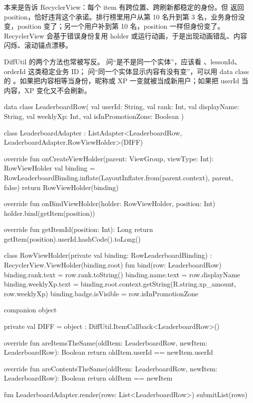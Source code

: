  本来是告诉 RecyclerView：每个 item 有跨位置、跨刷新都稳定的身份。但  返回 position，恰好违背这个承诺。排行榜里用户从第 10 名升到第 3 名，业务身份没变，position 变了；另一个用户补到第 10 名，position 一样但身份变了。RecyclerView 会基于错误身份复用 holder 或运行动画，于是出现动画错乱、内容闪烁、滚动锚点漂移。

DiffUtil 的两个方法也常被写反。 问“是不是同一个实体”，应该看 、lessonId、orderId 这类稳定业务 ID； 问“同一个实体显示内容有没有变”，可以用 data class 的 。如果把内容相等当身份，昵称或 XP 一变就被当成新用户；如果把 userId 当内容，XP 变化又不会刷新。

\begin{ktfix}
data class LeaderboardRow(
    val userId: String,
    val rank: Int,
    val displayName: String,
    val weeklyXp: Int,
    val isInPromotionZone: Boolean
)

class LeaderboardAdapter : ListAdapter<LeaderboardRow, LeaderboardAdapter.RowViewHolder>(DIFF) {

    override fun onCreateViewHolder(parent: ViewGroup, viewType: Int): RowViewHolder {
        val binding = RowLeaderboardBinding.inflate(LayoutInflater.from(parent.context), parent, false)
        return RowViewHolder(binding)
    }

    override fun onBindViewHolder(holder: RowViewHolder, position: Int) {
        holder.bind(getItem(position))
    }

    override fun getItemId(position: Int): Long {
        return getItem(position).userId.hashCode().toLong()
    }

    class RowViewHolder(private val binding: RowLeaderboardBinding) : RecyclerView.ViewHolder(binding.root) {
        fun bind(row: LeaderboardRow) {
            binding.rank.text = row.rank.toString()
            binding.name.text = row.displayName
            binding.weeklyXp.text = binding.root.context.getString(R.string.xp_amount, row.weeklyXp)
            binding.badge.isVisible = row.isInPromotionZone
        }
    }

    companion object {
        private val DIFF = object : DiffUtil.ItemCallback<LeaderboardRow>() {
            override fun areItemsTheSame(oldItem: LeaderboardRow, newItem: LeaderboardRow): Boolean {
                return oldItem.userId == newItem.userId
            }

            override fun areContentsTheSame(oldItem: LeaderboardRow, newItem: LeaderboardRow): Boolean {
                return oldItem == newItem
            }
        }
    }
}

fun LeaderboardAdapter.render(rows: List<LeaderboardRow>) {
    submitList(rows)
}
\end{ktfix}

